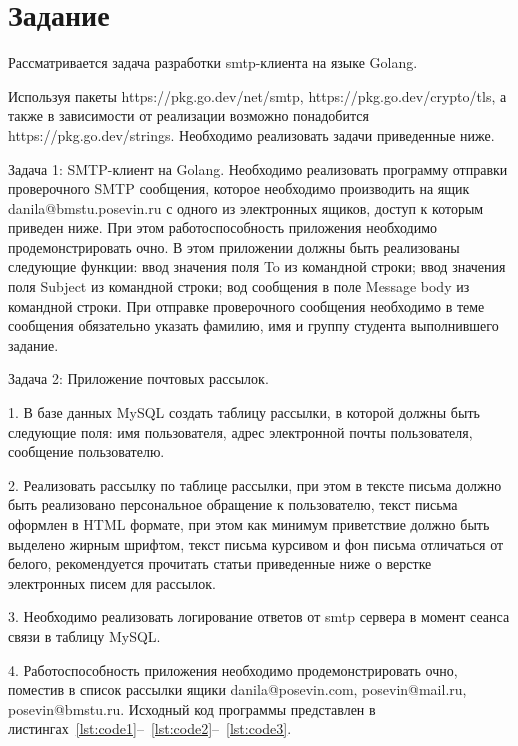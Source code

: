 \documentclass[a4paper, 14pt]{extarticle}
\begin{document}
\renewcommand{\ttdefault}{pcr}

\setlength{\tabcolsep}{3pt}
\newpage
\setcounter{page}{2}
\section{Задание}\label{Sect::task}
Рассматривается задача разработки smtp-клиента на языке Golang.

Используя пакеты https://pkg.go.dev/net/smtp, https://pkg.go.dev/crypto/tls, а также в
зависимости от реализации возможно понадобится https://pkg.go.dev/strings.
Необходимо реализовать задачи приведенные ниже.

Задача 1: SMTP-клиент на Golang.
Необходимо реализовать программу отправки проверочного SMTP
сообщения, которое необходимо производить на ящик danila@bmstu.posevin.ru с
одного из электронных ящиков, доступ к которым приведен ниже. При этом
работоспособность приложения необходимо продемонстрировать очно. В этом
приложении должны быть реализованы следующие функции:
ввод значения поля To из командной строки;
ввод значения поля Subject из командной строки;
вод сообщения в поле Message body из командной строки.
При отправке проверочного сообщения необходимо в теме сообщения
обязательно указать фамилию, имя и группу студента выполнившего задание.

Задача 2: Приложение почтовых рассылок.

1. В базе данных MySQL создать таблицу рассылки, в которой должны быть
следующие поля: имя пользователя, адрес электронной почты
пользователя, сообщение пользователю.

2. Реализовать рассылку по таблице рассылки, при этом в тексте письма
должно быть реализовано персональное обращение к пользователю, текст
письма оформлен в HTML формате, при этом как минимум приветствие
должно быть выделено жирным шрифтом, текст письма курсивом и фон
письма отличаться от белого, рекомендуется прочитать статьи приведенные
ниже о верстке электронных писем для рассылок.

3. Необходимо реализовать логирование ответов от smtp сервера в момент
сеанса связи в таблицу MySQL.

4. Работоспособность приложения необходимо продемонстрировать очно,
поместив в список рассылки ящики danila@posevin.com, posevin@mail.ru,
posevin@bmstu.ru.
Исходный код программы представлен в листингах~\ref{lst:code1}--~\ref{lst:code2}--~\ref{lst:code3}.
\end{document}
